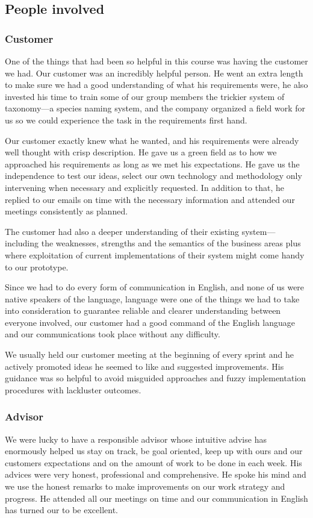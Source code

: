 \subsection{People involved}
	\subsubsection{Customer}
One of the things that had been so helpful in this course was having the customer we had. Our customer was an incredibly helpful person. He went an extra length to make sure we had a good understanding of what his requirements were, he also invested his time to train some of our group members the trickier system of taxonomy---a species naming system, and the company organized a field work for us so we could experience the task in the requirements first hand.

Our customer exactly knew what he wanted, and his requirements were already well thought with crisp description. He gave us a green field as to how we approached his requirements as long as we met his expectations. He gave us the independence to test our ideas, select our own technology and methodology only intervening when necessary and explicitly requested. In addition to that, he replied to our emails on time with the necessary information and attended our meetings consistently as planned.

The customer had also a deeper understanding of their existing system---including the weaknesses, strengths and the semantics of the business areas plus where exploitation of current implementations of their system might come handy to our prototype.

Since we had to do every form of communication in English, and none of us were native speakers of the language, language were one of the things we had to take into consideration to guarantee reliable and clearer understanding between everyone involved, our customer had a good command of the English language and our communications took place without any difficulty.

We usually held our customer meeting at the beginning of every sprint and he actively promoted ideas he seemed to like and suggested improvements.  His guidance was so helpful to avoid misguided approaches and fuzzy implementation procedures with lackluster outcomes.

	\subsubsection{Advisor}
We were lucky to have a responsible advisor whose intuitive advise has enormously helped us stay on track, be goal oriented, keep up with ours and our customers expectations and on the amount of work to be done in each week. His advices were very honest, professional and comprehensive. He spoke his mind and we use the honest remarks to make improvements on our work strategy and progress. He attended all our meetings on time and our communication in English has turned our to be excellent.

